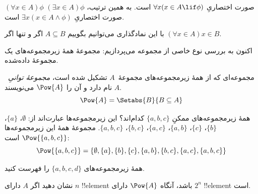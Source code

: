 \documentclass[../../../include/open-logic-section]{subfiles}
\begin{document}
\begin{defn}
$(\forall x \in A)\phi$ صورت اختصاریِ $\forall x(x \in A \lif
\phi)$ است. به همین ترتیب، $(\exists x \in A)\phi$ صورت اختصاریِ
$\exists x(x \in A \land \phi)$ است.
\end{defn}

با این نمادگذاری می‌توانیم بگوییم $A \subseteq B$ اگر و تنها اگر
$(\forall x \in A)x \in B$.

اکنون به بررسی نوع خاصی از مجموعه می‌پردازیم: مجموعهٔ همهٔ
زیرمجموعه‌های یک مجموعهٔ داده‌شده.

\begin{defn}
مجموعه‌ای که از همهٔ زیرمجموعه‌های مجموعهٔ~$A$ تشکیل شده است،
\emph{مجموعهٔ توانیِ}~$A$ نام دارد و آن را $\Pow{A}$ می‌نویسند.
  \[
    \Pow{A} = \Setabs{B}{B \subseteq A}
  \]
\end{defn}

\begin{ex}
همهٔ زیرمجموعه‌های ممکنِ $\{ a, b, c \}$ کدام‌اند؟ این زیرمجموعه‌ها
عبارت‌اند از: $\emptyset$، $\{a \}$، $\{b\}$، $\{c\}$، $\{a, b\}$،
$\{a, c\}$، $\{b,
c\}$، $\{a, b, c\}$. مجموعهٔ همهٔ این زیرمجموعه‌ها
$\Pow{\{a,b,c\}}$ است:
\[
\Pow{\{ a, b, c \}} = \{\emptyset, \{a \}, \{b\}, \{c\}, \{a, b\},
\{b, c\}, \{a, c\}, \{a, b, c\}\}
\]
\end{ex}

\begin{prob}
همهٔ زیرمجموعه‌های $\{a, b, c, d\}$ را فهرست کنید.
\end{prob}

\begin{prob}
نشان دهید اگر $A$ دارای $n$ !!{element} باشد، آنگاه $\Pow{A}$ دارای
$2^n$ !!{element} است.
\end{prob}
\end{document}
